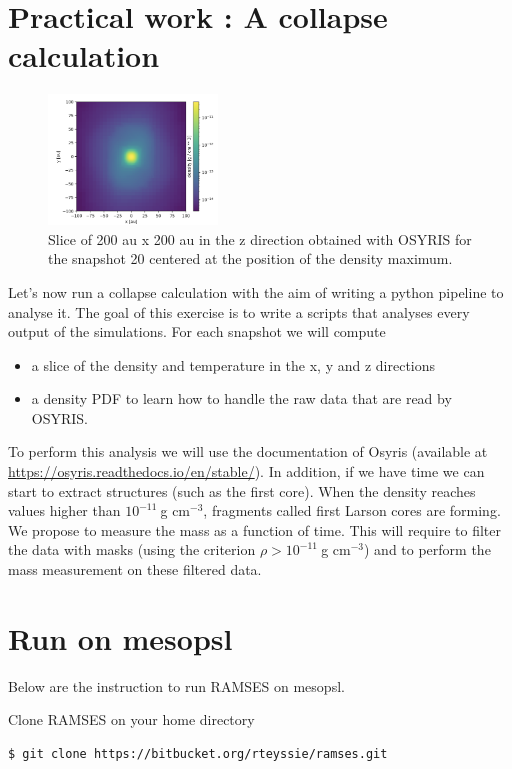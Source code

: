 \documentclass{article}
\begin{document}
\section{Practical work : A collapse calculation}

\begin{figure}[h!]
\centerline{\includegraphics[width=0.4\textwidth]{figures/slice_20.png}}
\caption{Slice of 200 au x 200 au in the z direction obtained with OSYRIS for the snapshot 20 centered at the position of the density maximum.}
\end{figure}
Let's now run a collapse calculation with the aim of writing a python pipeline to analyse it. The goal of this exercise is to write a scripts that analyses every output of the simulations. For each snapshot we will compute
\begin{itemize}
    \item a slice of the density and temperature in the x, y and z directions
    \item a density PDF to learn how to handle the raw data that are read by OSYRIS.
\end{itemize}
To perform this analysis we will use the documentation of Osyris (available at \url{https://osyris.readthedocs.io/en/stable/}).
In addition, if we have time we can start to extract structures (such as the first core). When the density reaches values higher than $10^{-11}~$g cm$^{-3}$, fragments called first Larson cores are forming. We propose to measure the mass as a function of time. This will require to filter the data with masks (using the criterion $\rho>10^{-11}~$g cm$^{-3}$) and to perform the mass measurement on these filtered data.

\section{Run on mesopsl}
Below are the instruction to run RAMSES on mesopsl.

Clone RAMSES on your home directory 
\begin{lstlisting}[]
$ git clone https://bitbucket.org/rteyssie/ramses.git
\end{lstlisting}
\end{document}
